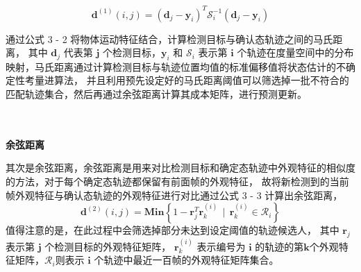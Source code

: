 \begin{equation}
	\bm{d}^{\left(1\right)}\left(i, j\right) = \left(\bm{d}_j - \bm{y}_i\right)^T\mathcal{S}_i^{-1}\left(\bm{d}_j - \bm{y}_i\right)
	\label{eq3-2}
\end{equation}


通过公式 3 - 2 将物体运动特征结合，计算检测目标与确认态轨迹之间的马氏距离，
其中 $\bm{d}_j$ 代表第 $\bm{j}$ 个检测目标，$\bm{y}_i$ 和 $\mathcal{S}_i$ 表示第 $\bm{i}$ 个轨迹在度量空间中的分布映射，马氏距离通过计算检测目标与轨迹位置均值的标准偏移值将状态估计的不确定性考量进算法，
并且利用预先设定好的马氏距离阈值可以筛选掉一批不符合的匹配轨迹集合，然后再通过余弦距离计算其成本矩阵，进行预测更新。

\\ \hspace*{\fill} \\
\textbf{余弦距离}

其次是余弦距离，余弦距离是用来对比检测目标和确定态轨迹中外观特征的相似度的方法，对于每个确定态轨迹都保留有前面帧的外观特征，
故将新检测到的当前帧外观特征与确认态轨迹的外观特征进行对比通过公式 3 - 3 计算出余弦距离，
\begin{equation}
	\bm{d}^{\left(2\right)}\left(i, j\right) = \bm{Min}\left\{ 1 - \bm{r}_j^T\bm{r}_k^{\left(i\right)} \ \ | \ \ \bm{r}_k^{\left(i\right)} \in \mathcal{R}_i \right\}
	\label{eq3-3}
\end{equation}
值得注意的是，在此过程中会筛选掉部分未达到设定阈值的轨迹候选人，
其中 $\bm{r}_j$ 表示第 $\bm{j}$ 个检测目标的外观特征矩阵，
$\bm{r}_k^{\left(i\right)}$ 表示编号为 $\bm{i}$ 的轨迹的第$\bm{k}$个外观特征矩阵，$\mathcal{R}_i$则表示 $\bm{i}$ 个轨迹中最近一百帧的外观特征矩阵集合。

